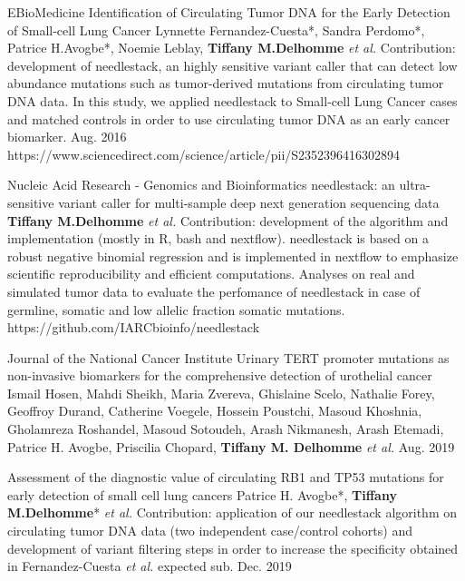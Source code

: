 \begin{cventries}
 
  \cvpublicationentry
    {EBioMedicine} %
    {Identification of Circulating Tumor DNA for the Early Detection of Small-cell Lung Cancer} %
    {Lynnette Fernandez-Cuesta*, Sandra Perdomo*, Patrice H.Avogbe*, Noemie Leblay, \textbf{Tiffany M.Delhomme} \textit{et al.}} %
    {Contribution: development of needlestack, an highly sensitive variant caller that can detect low abundance mutations such as tumor-derived mutations from circulating tumor DNA data. In this study, we applied needlestack to Small-cell Lung Cancer cases and matched controls in order to use circulating tumor DNA as an early cancer biomarker.}
    {Aug. 2016} %
    {https://www.sciencedirect.com/science/article/pii/S2352396416302894}


	\cvpublicationentry
    {Nucleic Acid Research - Genomics and Bioinformatics} %
    {needlestack: an ultra-sensitive variant caller for multi-sample deep next generation sequencing data} %
    {\textbf{Tiffany M.Delhomme} \textit{et al.}} %
    {Contribution: development of the algorithm and implementation (mostly in R, bash and nextflow). needlestack is based on a robust negative binomial regression and is implemented in nextflow to emphasize scientific reproducibility and efficient computations. Analyses on real and simulated tumor data to evaluate the perfomance of needlestack in case of germline, somatic and low allelic fraction somatic mutations.}
    {} %
    {https://github.com/IARCbioinfo/needlestack}
    
 
     \cvpublicationentry
   {Journal of the National Cancer Institute} %
    {Urinary TERT promoter mutations as non-invasive biomarkers for the comprehensive detection of urothelial cancer} %
    {Ismail Hosen, Mahdi Sheikh, Maria Zvereva, Ghislaine Scelo, Nathalie Forey, Geoffroy Durand, Catherine Voegele, Hossein Poustchi, Masoud Khoshnia, Gholamreza Roshandel, Masoud Sotoudeh, Arash Nikmanesh, Arash Etemadi, Patrice H. Avogbe, Priscilia Chopard, \textbf{Tiffany M. Delhomme} \textit{et al.}} %
    {}
    {Aug. 2019} %
    {}     
    

    \cvpublicationentry
    {} %
    {Assessment of the diagnostic value of circulating RB1 and
TP53 mutations for early detection of small cell lung cancers} %
    {Patrice H. Avogbe*, \textbf{Tiffany M.Delhomme}* \textit{et al.}} %
    {Contribution: application of our needlestack algorithm on circulating tumor DNA data (two independent case/control cohorts) and development of variant filtering steps in order to increase the specificity obtained in Fernandez-Cuesta \textit{et al.}}
    {expected sub. Dec. 2019} %
    {}
\end{cventries}
